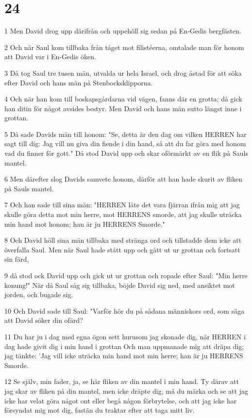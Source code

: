 \chapter{24}

\par 1 Men David drog upp därifrån och uppehöll sig sedan på En-Gedis bergfästen.
\par 2 Och när Saul kom tillbaka från tåget mot filistéerna, omtalade man för honom att David var i En-Gedis öken.
\par 3 Då tog Saul tre tusen män, utvalda ur hela Israel, och drog åstad för att söka efter David och hans män på Stenbocksklipporna.
\par 4 Och när han kom till boskapsgårdarna vid vägen, fanns där en grotta; då gick han ditin för något avsides bestyr. Men David och hans män sutto längst inne i grottan.
\par 5 Då sade Davids män till honom: "Se, detta är den dag om vilken HERREN har sagt till dig: Jag vill nu giva din fiende i din hand, så att du far göra med honom vad du finner för gott." Då stod David upp och skar oförmärkt av en flik på Sauls mantel.
\par 6 Men därefter slog Davids samvete honom, därför att han hade skurit av fliken på Sauls mantel.
\par 7 Och han sade till sina män: "HERREN låte det vara fjärran ifrån mig att jag skulle göra detta mot min herre, mot HERRENS smorde, att jag skulle uträcka min hand mot honom; han är ju HERRENS Smorde."
\par 8 Och David höll sina män tillbaka med stränga ord och tillstadde dem icke att överfalla Saul. Men när Saul hade stått upp och gått ut ur grottan och fortsatt sin färd,
\par 9 då stod ock David upp och gick ut ur grottan och ropade efter Saul: "Min herre konung!" När då Saul såg sig tillbaka, böjde David sig ned, med ansiktet mot jorden, och bugade sig.
\par 10 Och David sade till Saul: "Varför hör du på sådana människors ord, som säga att David söker din ofärd?
\par 11 Du har ju i dag med egna ögon sett hurusom jag skonade dig, när HERREN i dag hade givit dig i min hand i grottan Och man uppmanade mig att dräpa dig; jag tänkte: 'Jag vill icke uträcka min hand mot min herre; han är ju HERRENS Smorde.
\par 12 Se själv, min fader, ja, se här fliken av din mantel i min hand. Ty därav att jag skar av fliken på din mantel, men icke dräpte dig, må du märka och se att jag icke har velat göra något ont eller begå någon förbrytelse, och att jag icke har försyndat mig mot dig, fastän du traktar efter att taga mitt liv.

